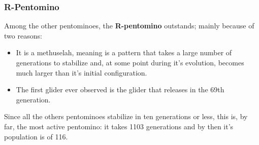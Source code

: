 \subsubsection{R-Pentomino}
Among the other pentominoes, the \textbf{R-pentomino} outstands; mainly because
of two reasons:
	\begin{itemize}
		\item It is a methuselah\footnotemark, meaning is a pattern that takes a
			large number of generations to stabilize and, at some point during it's
			evolution, becomes much larger than it's initial configuration.
		\item The first glider ever observed is the glider that releases in the
		 	69th generation.
	\end{itemize}
Since all the others pentominoes stabilize in ten generations or less, this is,
by far, the most active pentomino: it takes 1103 generations and by then it's
population is of 116.

